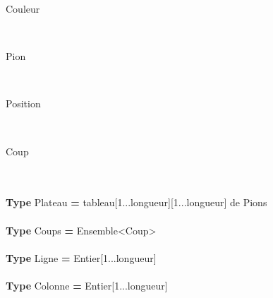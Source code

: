 \begin{algorithme}

	\begin{enregistrement}{Couleur}
	\end{enregistrement}
\\	
	\begin{enregistrement}{Pion}
	\end{enregistrement}
\\
	\begin{enregistrement}{Position}
	\end{enregistrement}
\\

	\begin{enregistrement}{Coup}
	\end{enregistrement}
\\\\	
	\textbf{Type} Plateau \textbf{=} tableau[1...longueur][1...longueur] de Pions
\\\\
	\textbf{Type} Coups \textbf{=} Ensemble<Coup>
\\\\
	\textbf{Type} Ligne \textbf{=} Entier[1...longueur]
\\\\
	\textbf{Type} Colonne \textbf{=} Entier[1...longueur] 
	
\end{algorithme}

